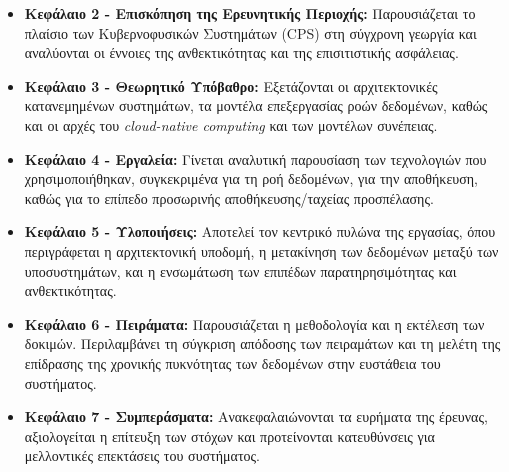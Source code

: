 \begin{itemize}
	\item \textbf{Κεφάλαιο 2 - Επισκόπηση της Ερευνητικής Περιοχής:}
	      Παρουσιάζεται το πλαίσιο των Κυβερνοφυσικών Συστημάτων (CPS)
	      στη σύγχρονη γεωργία και αναλύονται οι έννοιες της
	      ανθεκτικότητας και της επισιτιστικής ασφάλειας.
	\item \textbf{Κεφάλαιο 3 - Θεωρητικό Υπόβαθρο:} Εξετάζονται οι
	      αρχιτεκτονικές κατανεμημένων συστημάτων, τα μοντέλα
	      επεξεργασίας ροών δεδομένων, καθώς και οι αρχές του
	      \textit{cloud-native computing} και των μοντέλων συνέπειας.
	\item \textbf{Κεφάλαιο 4 - Εργαλεία:} Γίνεται αναλυτική παρουσίαση των
	      τεχνολογιών που χρησιμοποιήθηκαν, συγκεκριμένα για τη ροή
	      δεδομένων, για την αποθήκευση, καθώς για το επίπεδο προσωρινής
	      αποθήκευσης/ταχείας προσπέλασης.
	\item \textbf{Κεφάλαιο 5 - Υλοποιήσεις:} Αποτελεί τον κεντρικό πυλώνα
	      της εργασίας, όπου περιγράφεται η αρχιτεκτονική υποδομή, η
	      μετακίνηση των δεδομένων μεταξύ των υποσυστημάτων, και η
	      ενσωμάτωση των επιπέδων παρατηρησιμότητας και ανθεκτικότητας.
	\item \textbf{Κεφάλαιο 6 - Πειράματα:} Παρουσιάζεται η μεθοδολογία και
	      η εκτέλεση των δοκιμών. Περιλαμβάνει τη σύγκριση απόδοσης των
	      πειραμάτων και τη μελέτη της επίδρασης της χρονικής πυκνότητας
	      των δεδομένων στην ευστάθεια του συστήματος.
	\item \textbf{Κεφάλαιο 7 - Συμπεράσματα:} Ανακεφαλαιώνονται τα ευρήματα
	      της έρευνας, αξιολογείται η επίτευξη των στόχων και
	      προτείνονται κατευθύνσεις για μελλοντικές επεκτάσεις του
	      συστήματος.
\end{itemize}
